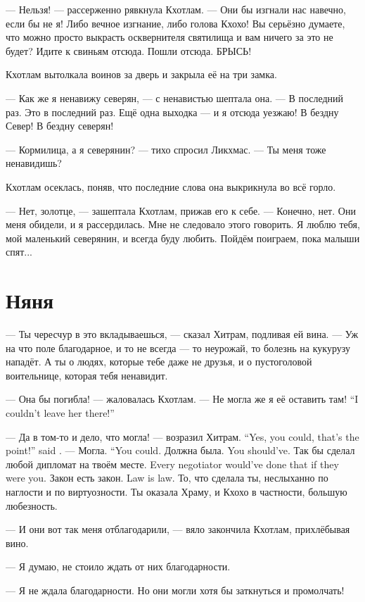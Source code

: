 --- Нельзя! --- рассерженно рявкнула Кхотлам.
--- Они бы изгнали нас навечно, если бы не я!
Либо вечное изгнание, либо голова Кхохо!
Вы серьёзно думаете, что можно просто выкрасть осквернителя святилища и вам ничего за это не будет?
Идите к свиньям отсюда.
Пошли отсюда.
БРЫСЬ!

Кхотлам вытолкала воинов за дверь и закрыла её на три замка.

--- Как же я ненавижу северян, --- с ненавистью шептала она.
--- В последний раз.
Это в последний раз.
Ещё одна выходка --- и я отсюда уезжаю!
В бездну Север!
В бездну северян!

--- Кормилица, а я северянин? --- тихо спросил Ликхмас.
--- Ты меня тоже ненавидишь?

Кхотлам осеклась, поняв, что последние слова она выкрикнула во всё горло.

--- Нет, золотце, --- зашептала Кхотлам, прижав его к себе.
--- Конечно, нет.
Они меня обидели, и я рассердилась.
Мне не следовало этого говорить.
Я люблю тебя, мой маленький северянин, и всегда буду любить.
Пойдём поиграем, пока малыши спят...

\section{Няня}

--- Ты чересчур в это вкладываешься, --- сказал Хитрам, подливая ей вина.
--- Уж на что поле благодарное, и то не всегда --- то неурожай, то болезнь на кукурузу нападёт.
А ты о людях, которые тебе даже не друзья, и о пустоголовой воительнице, которая тебя ненавидит.

--- Она бы погибла! --- жаловалась Кхотлам.
{--- Не могла же я её оставить там!}
{``I couldn't leave her there!''}

{--- Да в том-то и дело, что могла! --- возразил Хитрам.}
{``Yes, you could, that's the point!'' said \Chitram.}
{--- Могла.}
{``You could.}
{Должна была.}
{You should've.}
{Так бы сделал любой дипломат на твоём месте.}
{Every negotiator would've done that if they were you.}
{Закон есть закон.}
{Law is law.}
То, что сделала ты, неслыханно по наглости и по виртуозности.
Ты оказала Храму, и Кхохо в частности, большую любезность.

--- И они вот так меня отблагодарили, --- вяло закончила Кхотлам, прихлёбывая вино.

--- Я думаю, не стоило ждать от них благодарности.

--- Я не ждала благодарности.
Но они могли хотя бы заткнуться и промолчать!

